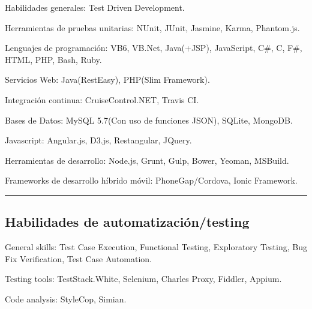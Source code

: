 \documentclass[10pt,letterpaper]{article}
\newenvironment{indentsection}[1]%
{\begin{list}{}%
	{\setlength{\leftmargin}{#1}}%
	\item[]%
}
{\end{list}}
\begin{document}
\begin{indentsection}{\parindent}
\begin{description*}
	\item[Habilidades generales:]
	Test Driven Development.
	
	\item[Herramientas de pruebas unitarias:]
	NUnit,
	JUnit,
	Jasmine,
    Karma,
    Phantom.js.
	
	\item[Lenguajes de programación:]
	VB6,
	VB.Net,
	Java(+JSP),
	JavaScript,
	C\#,
	C,
	F\#,
	HTML,
	PHP,
    Bash,
	Ruby. 
    
	\item[Servicios Web:]
	Java(RestEasy),
	PHP(Slim Framework).
	
	\item[Integración continua:]
	CruiseControl.NET,
    Travis CI. 
	
	\item[Bases de Datos:]
	MySQL 5.7(Con uso de funciones JSON),
    SQLite,
    MongoDB.
	
	\item[Javascript:]
	Angular.js,
    D3.js,
    Restangular,
    JQuery.
    
    \item[Herramientas de desarrollo:]
	Node.js,
    Grunt,
    Gulp,
    Bower,
    Yeoman,
    MSBuild.
    
    \item[Frameworks de desarrollo híbrido móvil:]
    PhoneGap/Cordova,
    Ionic Framework.
	
\end{description*}
\end{indentsection}

\hrule
\vspace{-0.4em}
\subsection*{Habilidades de automatización/testing}

\begin{indentsection}{\parindent}
\begin{description*}

    \item[General skills:]
    Test Case Execution,
    Functional Testing,
    Exploratory Testing,
    Bug Fix Verification,
    Test Case Automation.
	
	\item[Testing tools:]
	TestStack.White,
	Selenium,
    Charles Proxy,
    Fiddler,
    Appium.
	
	\item[Code analysis:]
	StyleCop,
	Simian. 
\end{description*}
\end{indentsection}
\end{document}
